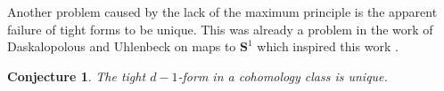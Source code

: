 \documentclass[reqno,11pt]{amsart}
\newcommand{\Sph}{\mathbf S}
\newtheorem{conjecture}[theorem]{Conjecture}
\theoremstyle{definition}
\numberwithin{equation}{section}
\begin{document}
Another problem caused by the lack of the maximum principle is the apparent failure of tight forms to be unique.
This was already a problem in the work of Daskalopolous and Uhlenbeck on maps to $\Sph^1$ which inspired this work \cite[Conjecture 9.2]{daskalopoulos2020transverse}.

\begin{conjecture}
The tight $d - 1$-form in a cohomology class is unique.
\end{conjecture}







\printbibliography
\end{document}
